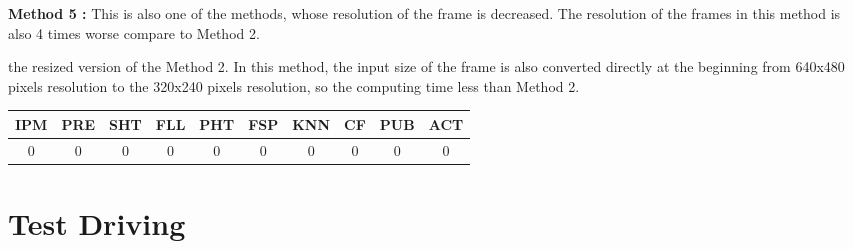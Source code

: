 \textbf{Method 5 : }This is also one of the methods, whose resolution of the frame is decreased. The resolution of the frames in this method is also 4 times worse compare to Method 2.


 the resized version of the Method 2. In this method, the input size of the frame is also converted directly at the beginning from 640x480 pixels resolution to the 320x240 pixels resolution, so the computing time less than Method 2.


\begin{center}
  \begin{tabular}{ | c | c | c | c | c | c | c | c | c | c |}
    \hline
  
  IPM 		& PRE 		& SHT	   & FLL 	   & PHT 	   & FSP 	    & KNN 	   & CF 	  & PUB 	& ACT \\ \hline  
  0   &  0  &  0  &  0  &  0  &  0 &  0  &  0  & 0 & 0\\ \hline  
    
    
      \end{tabular}
  \label{tab:Case5_Times}
\end{center}




\section{Test Driving}\label{sec:Test Driving}


